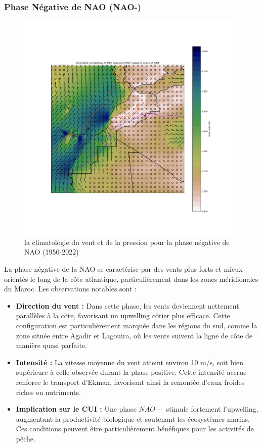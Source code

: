 \subsubsection{Phase Négative de NAO (NAO-)}


\begin{figure}[H]
\centering
\includegraphics[scale=0.3]{NEG_PHASE.png}
\caption{la climatologie du vent et de la pression pour la phase négative de NAO (1950-2022)}
\end{figure}


La phase négative de la NAO se caractérise par des vents plus forts et mieux orientés le long de la côte atlantique, particulièrement dans les zones méridionales du Maroc. Les observations notables sont :
\begin{itemize}
	\item \textbf {Direction du vent :} Dans cette phase, les vents deviennent nettement parallèles à la côte, favorisant un upwelling côtier plus efficace. Cette configuration est particulièrement marquée dans les régions du sud, comme la zone située entre Agadir et Lagouira, où les vents suivent la ligne de côte de manière quasi parfaite.
	
	\item \textbf{Intensité :} La vitesse moyenne du vent atteint environ 10 m/s, soit bien supérieure à celle observée durant la phase positive. Cette intensité accrue renforce le transport d'Ekman, favorisant ainsi la remontée d’eaux froides riches en nutriments.
	
	\item \textbf{Implication sur le CUI :} Une phase $NAO - $ stimule fortement l’upwelling, augmentant la productivité biologique et soutenant les écosystèmes marins. Ces conditions peuvent être particulièrement bénéfiques pour les activités de pêche.
\end{itemize}


 
 